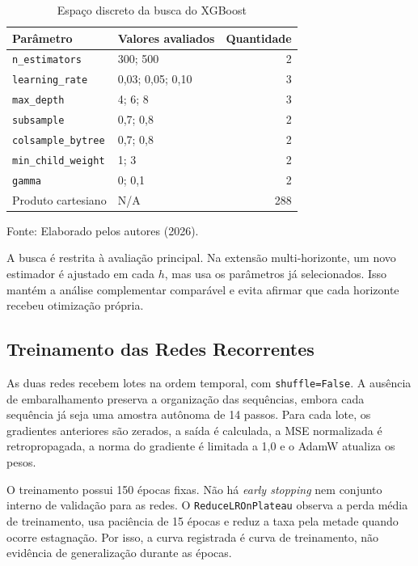 \begin{table}[H]
\centering
\caption{Espaço discreto da busca do XGBoost}
\label{tab:espaco_grid_detalhado}
\small
\begin{tabularx}{\textwidth}{p{4cm} X r}
\toprule
\textbf{Parâmetro} & \textbf{Valores avaliados} & \textbf{Quantidade} \\
\midrule
\texttt{n\_estimators} & 300; 500 & 2 \\
\texttt{learning\_rate} & 0,03; 0,05; 0,10 & 3 \\
\texttt{max\_depth} & 4; 6; 8 & 3 \\
\texttt{subsample} & 0,7; 0,8 & 2 \\
\texttt{colsample\_bytree} & 0,7; 0,8 & 2 \\
\texttt{min\_child\_weight} & 1; 3 & 2 \\
\texttt{gamma} & 0; 0,1 & 2 \\
\midrule
Produto cartesiano & N/A & 288 \\
\bottomrule
\end{tabularx}
\small{Fonte: Elaborado pelos autores (2026).}
\end{table}

A busca é restrita à avaliação principal. Na extensão multi-horizonte, um novo estimador é ajustado em cada $h$, mas usa os parâmetros já selecionados. Isso mantém a análise complementar comparável e evita afirmar que cada horizonte recebeu otimização própria.

\subsection{Treinamento das Redes Recorrentes}

As duas redes recebem lotes na ordem temporal, com \texttt{shuffle=False}. A ausência de embaralhamento preserva a organização das sequências, embora cada sequência já seja uma amostra autônoma de 14 passos. Para cada lote, os gradientes anteriores são zerados, a saída é calculada, a MSE normalizada é retropropagada, a norma do gradiente é limitada a 1,0 e o AdamW atualiza os pesos.

O treinamento possui 150 épocas fixas. Não há \textit{early stopping} nem conjunto interno de validação para as redes. O \texttt{ReduceLROnPlateau} observa a perda média de treinamento, usa paciência de 15 épocas e reduz a taxa pela metade quando ocorre estagnação. Por isso, a curva registrada é curva de treinamento, não evidência de generalização durante as épocas.

